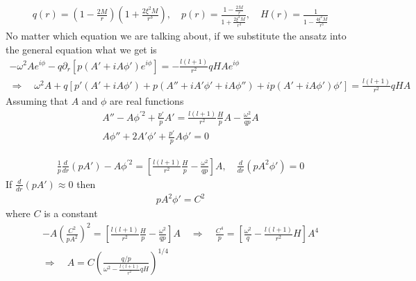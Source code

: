 \documentclass[12pt]{article}
\def\nn{\nonumber}
\begin{document}
\begin{gather}
q(r)
=
(1 - \frac{2 M}{r})
(1 + \frac{2 \xi^{2} M}{r^{3}})
,
\quad
p(r)
=
\frac{1 - \frac{2 M}{r}}{1 + \frac{2 \xi^{2} M}{r^{3}}}
,
\quad
H(r)
=
\frac{1}{1 - \frac{4 \xi^{2} M}{r^{3}}}
\end{gather}
No matter which equation we are talking about, if we substitute the ansatz into the general equation what we get is
\begin{gather}
-
\omega^{2}
A
e^{i\phi}
-
q
\partial_{r}
\left[
p
(A' + i A \phi')
e^{i \phi}
\right]
=
-\frac{l (l +1)}{r^{2}}
q H
A
e^{i \phi}
\nn \\
\Rightarrow
\quad
\omega^{2}
A
+
q
\left[
p'
(A' + i A \phi')
+
p
(A'' + i A' \phi' + i A \phi'')
+
i p
(A' + i A \phi')
\phi'
\right]
=
\frac{l (l +1)}{r^{2}}
q H
A
\end{gather}
Assuming that $A$ and $\phi$ are real functions
\begin{gather}
A''
-
A \phi^{\prime 2}
+
\frac{p'}{p} A'
=
\frac{l (l +1)}{r^{2}}
\frac{H}{p} A
-
\frac{\omega^{2}}{q p}
A
\\
A \phi''
+
2 A' \phi'
+
\frac{p'}{p} A \phi'
=0
\end{gather}

\begin{gather}
\frac{1}{p}
\frac{d}{dr}
(p A')
-
A \phi^{\prime 2}
=
\left[
\frac{l (l +1)}{r^{2}}
\frac{H}{p}
-
\frac{\omega^{2}}{q p}
\right]
A
,
\quad
\frac{d}{dr}
(p A^{2} \phi')
=0
\end{gather}
If $\frac{d}{dr}( p A') \approx 0$ then
\begin{gather}
p A^{2} \phi'
=
C^{2}
\end{gather}
where $C$ is a constant
\begin{gather}
-
A
\left(
\frac{C^{2}}{p A^{2}}
\right)^{2}
=
\left[
\frac{l (l +1)}{r^{2}}
\frac{H}{p}
-
\frac{\omega^{2}}{q p}
\right]
A
\quad
\Rightarrow
\quad
\frac{C^{4}}{p}
=
\left[
\frac{\omega^{2}}{q}
-
\frac{l (l +1)}{r^{2}}
H
\right]
A^{4}
\nn \\
\Rightarrow
\quad
A
=
C
\left(
\frac{q/p}{\omega^{2}
-
\frac{l (l +1)}{r^{2}}
q H}
\right)^{1/4}
\end{gather}
\end{document}
